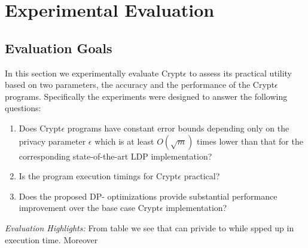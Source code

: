 \section{Experimental Evaluation}
\subsection{Evaluation Goals}
In this section we experimentally evaluate  Crypt$\epsilon$ to assess its practical utility  based on two parameters, the accuracy and the performance of the Crypt$\epsilon$ programs. Specifically the experiments were designed to answer the following questions:
\begin{enumerate}\item Does Crypt$\epsilon$ programs have constant error bounds depending only on the privacy parameter $\epsilon$  which is at least $O(\sqrt{m})$ times lower than that for the corresponding state-of-the-art LDP implementation? \item Is the program execution timings for Crypt$\epsilon$ practical? \item Does the proposed DP- optimizations provide substantial performance improvement over the base case Crypt$\epsilon$ implementation? \end{enumerate}
\textit{Evaluation Highlights:}
From table we see that can privide to while  spped up in execution time. Moreover 
